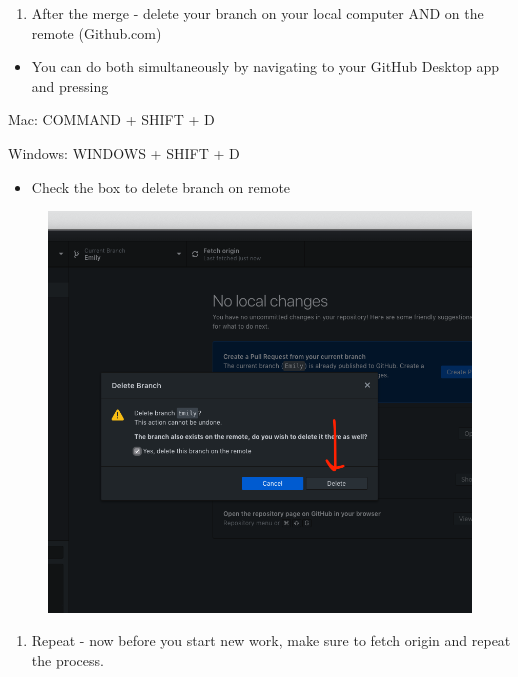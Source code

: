 \documentclass[]{book}
\providecommand{\tightlist}{%
  \setlength{\itemsep}{0pt}\setlength{\parskip}{0pt}}
\begin{document}
\begin{enumerate}
\def\labelenumi{\arabic{enumi}.}
\setcounter{enumi}{8}
\tightlist
\item
  After the merge - delete your branch on your local computer AND on the
  remote (Github.com)
\end{enumerate}

\begin{itemize}
\tightlist
\item
  You can do both simultaneously by navigating to your GitHub Desktop
  app and pressing
\end{itemize}

Mac: COMMAND + SHIFT + D

Windows: WINDOWS + SHIFT + D

\begin{itemize}
\tightlist
\item
  Check the box to delete branch on remote
\end{itemize}

\begin{figure}
\centering
\includegraphics{images/research_protocols/github/31.png}
\caption{}
\end{figure}

\begin{enumerate}
\def\labelenumi{\arabic{enumi}.}
\setcounter{enumi}{9}
\tightlist
\item
  Repeat - now before you start new work, make sure to fetch origin and
  repeat the process.
\end{enumerate}
\end{document}
